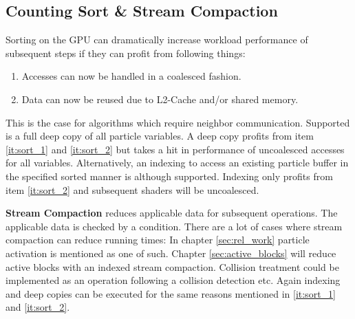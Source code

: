 \documentclass[m,times]{cgMA}
\begin{document}
\subsection{Counting Sort \& Stream Compaction}\label{sec:sort}
Sorting on the GPU can dramatically increase workload performance of subsequent steps if they can profit from following things:
\begin{enumerate}
  \item Accesses can now be handled in a coalesced fashion. \label{it:sort_1}
  \item Data can now be reused due to L2-Cache and/or shared memory. \label{it:sort_2}
\end{enumerate}
This is the case for algorithms which require neighbor communication. Supported is a full deep copy of all particle variables. A deep copy profits from item \ref{it:sort_1} and \ref{it:sort_2} but takes a hit in performance of uncoalesced accesses for all variables. Alternatively, an indexing to access an existing particle buffer in the specified sorted manner is although supported. Indexing only profits from item \ref{it:sort_2} and subsequent shaders will be uncoalesced.

\textbf{Stream Compaction} reduces applicable data for subsequent operations. The applicable data is checked by a condition. There are a lot of cases where stream compaction can reduce running times: In chapter \ref{sec:rel_work} particle activation is mentioned as one of such. Chapter \ref{sec:active_blocks} will reduce active blocks with an indexed stream compaction. Collision treatment could be implemented as an operation following a collision detection etc. Again indexing and deep copies can be executed for the same reasons mentioned in \ref{it:sort_1} and \ref{it:sort_2}.
\end{document}
